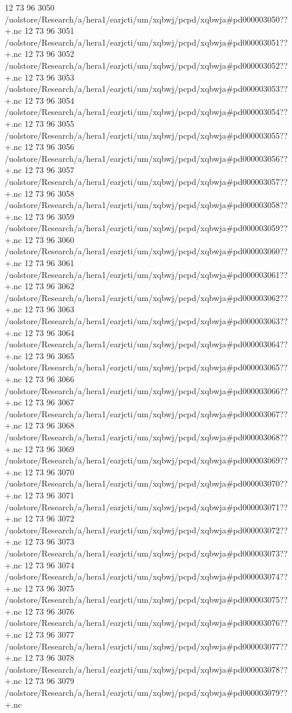 12 73 96
3050
/uolstore/Research/a/hera1/earjcti/um/xqbwj/pcpd/xqbwja#pd000003050??+.nc
12 73 96
3051
/uolstore/Research/a/hera1/earjcti/um/xqbwj/pcpd/xqbwja#pd000003051??+.nc
12 73 96
3052
/uolstore/Research/a/hera1/earjcti/um/xqbwj/pcpd/xqbwja#pd000003052??+.nc
12 73 96
3053
/uolstore/Research/a/hera1/earjcti/um/xqbwj/pcpd/xqbwja#pd000003053??+.nc
12 73 96
3054
/uolstore/Research/a/hera1/earjcti/um/xqbwj/pcpd/xqbwja#pd000003054??+.nc
12 73 96
3055
/uolstore/Research/a/hera1/earjcti/um/xqbwj/pcpd/xqbwja#pd000003055??+.nc
12 73 96
3056
/uolstore/Research/a/hera1/earjcti/um/xqbwj/pcpd/xqbwja#pd000003056??+.nc
12 73 96
3057
/uolstore/Research/a/hera1/earjcti/um/xqbwj/pcpd/xqbwja#pd000003057??+.nc
12 73 96
3058
/uolstore/Research/a/hera1/earjcti/um/xqbwj/pcpd/xqbwja#pd000003058??+.nc
12 73 96
3059
/uolstore/Research/a/hera1/earjcti/um/xqbwj/pcpd/xqbwja#pd000003059??+.nc
12 73 96
3060
/uolstore/Research/a/hera1/earjcti/um/xqbwj/pcpd/xqbwja#pd000003060??+.nc
12 73 96
3061
/uolstore/Research/a/hera1/earjcti/um/xqbwj/pcpd/xqbwja#pd000003061??+.nc
12 73 96
3062
/uolstore/Research/a/hera1/earjcti/um/xqbwj/pcpd/xqbwja#pd000003062??+.nc
12 73 96
3063
/uolstore/Research/a/hera1/earjcti/um/xqbwj/pcpd/xqbwja#pd000003063??+.nc
12 73 96
3064
/uolstore/Research/a/hera1/earjcti/um/xqbwj/pcpd/xqbwja#pd000003064??+.nc
12 73 96
3065
/uolstore/Research/a/hera1/earjcti/um/xqbwj/pcpd/xqbwja#pd000003065??+.nc
12 73 96
3066
/uolstore/Research/a/hera1/earjcti/um/xqbwj/pcpd/xqbwja#pd000003066??+.nc
12 73 96
3067
/uolstore/Research/a/hera1/earjcti/um/xqbwj/pcpd/xqbwja#pd000003067??+.nc
12 73 96
3068
/uolstore/Research/a/hera1/earjcti/um/xqbwj/pcpd/xqbwja#pd000003068??+.nc
12 73 96
3069
/uolstore/Research/a/hera1/earjcti/um/xqbwj/pcpd/xqbwja#pd000003069??+.nc
12 73 96
3070
/uolstore/Research/a/hera1/earjcti/um/xqbwj/pcpd/xqbwja#pd000003070??+.nc
12 73 96
3071
/uolstore/Research/a/hera1/earjcti/um/xqbwj/pcpd/xqbwja#pd000003071??+.nc
12 73 96
3072
/uolstore/Research/a/hera1/earjcti/um/xqbwj/pcpd/xqbwja#pd000003072??+.nc
12 73 96
3073
/uolstore/Research/a/hera1/earjcti/um/xqbwj/pcpd/xqbwja#pd000003073??+.nc
12 73 96
3074
/uolstore/Research/a/hera1/earjcti/um/xqbwj/pcpd/xqbwja#pd000003074??+.nc
12 73 96
3075
/uolstore/Research/a/hera1/earjcti/um/xqbwj/pcpd/xqbwja#pd000003075??+.nc
12 73 96
3076
/uolstore/Research/a/hera1/earjcti/um/xqbwj/pcpd/xqbwja#pd000003076??+.nc
12 73 96
3077
/uolstore/Research/a/hera1/earjcti/um/xqbwj/pcpd/xqbwja#pd000003077??+.nc
12 73 96
3078
/uolstore/Research/a/hera1/earjcti/um/xqbwj/pcpd/xqbwja#pd000003078??+.nc
12 73 96
3079
/uolstore/Research/a/hera1/earjcti/um/xqbwj/pcpd/xqbwja#pd000003079??+.nc
